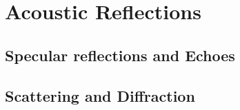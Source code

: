 







\section{Acoustic Reflections}
\subsection{Specular reflections and Echoes}

\subsection{Scattering and Diffraction}

